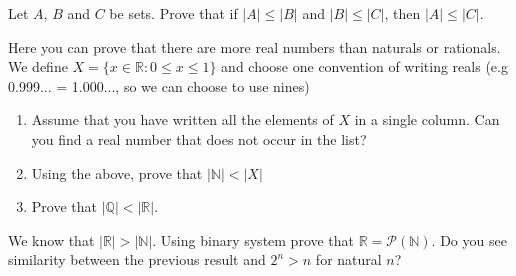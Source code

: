 %


\begin{exercise}
	Let $A,\,B$ and $C$ be sets. Prove that if $|A|\le |B|$ and $|B|\le |C|$, then $|A|\le |C|$.
\end{exercise}

\begin{prob}
	Here you can prove that there are more real numbers than naturals or rationals. We define $X=\{x\in \mathbb R : 0\le x\le 1\}$ and choose one
	 convention of writing reals (e.g 0.999... = 1.000..., so we can choose to use nines)
	\begin{enumerate}
		\item Assume that you have written all the elements of $X$ in a single column. Can you find a real number that does not occur in the list?
		\item Using the above, prove that $|\mathbb N| < |X|$
		\item Prove that $|\mathbb Q| < |\mathbb R|.$
	\end{enumerate}
\end{prob}

\begin{prob}
	We know that $|\mathbb R| > |\mathbb N|.$ Using binary system prove that $\mathbb R=\mathcal P(\mathbb N)$. Do you see similarity between the previous result
	and $2^n > n$ for natural $n$?
\end{prob}

